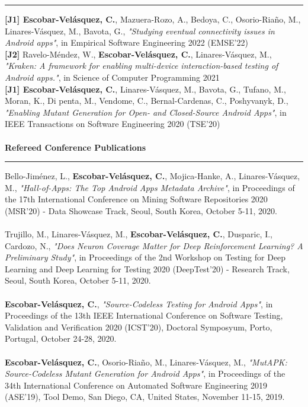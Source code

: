 \documentclass[letterpaper,11pt,oneside]{article}
\begin{document}
\vspace{-2ex}
\hrule 
\normalsize
\vspace{2ex}
\noindent \textbf{[J1] Escobar-Velásquez, C.}, Mazuera-Rozo, A., Bedoya, C., Osorio-Riaño, M., Linares-Vásquez, M., Bavota, G., \textit{"Studying eventual connectivity issues in Android apps"}, in Empirical Software Engineering 2022 (EMSE'22)\\
\noindent \textbf{[J2]} Ravelo-Méndez, W., \textbf{Escobar-Velásquez, C.},  Linares-Vásquez, M., \textit{"Kraken: A framework for enabling multi-device interaction-based testing of Android apps."}, in Science of Computer Programming 2021\\
\noindent \textbf{[J1] Escobar-Velásquez, C.}, Linares-V\'asquez, M., Bavota, G., Tufano, M., Moran, K., Di penta, M., Vendome, C., Bernal-Cardenas, C., Poshyvanyk, D., \textit{"Enabling Mutant Generation for Open- and Closed-Source Android Apps"}, in IEEE Transactions on Software Engineering 2020 (TSE’20)\\
\\
\noindent \Large{\textbf{Refereed Conference Publications}} \\
\vspace{-2ex}
\hrule 
\normalsize
\vspace{2ex}
\noindent [c6] Bello-Jiménez, L., \textbf{Escobar-Velásquez, C.}, Mojica-Hanke, A., Linares-V\'asquez,  M., \textit{"Hall-of-Apps: The Top Android Apps Metadata Archive"}, in Proceedings of the 17th International Conference on Mining Software Repositories 2020 (MSR’20) - Data Showcase Track, Seoul, South Korea, October 5-11, 2020. \\
\\
\noindent [c5] Trujillo, M., Linares-V\'asquez,  M., \textbf{Escobar-Velásquez, C.}, Dusparic, I., Cardozo, N., \textit{"Does Neuron Coverage Matter for Deep Reinforcement Learning? A Preliminary Study"}, in Proceedings of the 2nd Workshop on Testing for Deep Learning and Deep Learning for Testing 2020 (DeepTest’20) - Research Track, Seoul, South Korea, October 5-11, 2020. \\
\\
\noindent [c4] \textbf{Escobar-Velásquez, C.}, \textit{"Source-Codeless Testing for Android Apps"}, in Proceedings of the 13th IEEE International Conference on Software Testing, Validation and Verification 2020 (ICST’20), Doctoral Symposyum, Porto, Portugal, October 24-28, 2020. \\
\\
\noindent [c3] \textbf{Escobar-Velásquez, C.}, Osorio-Riaño, M., Linares-Vásquez, M., \textit{"MutAPK: Source-Codeless Mutant Generation for Android Apps"}, in Proceedings of the 34th International Conference on Automated Software Engineering 2019 (ASE’19), Tool Demo, San Diego, CA, United States, November 11-15, 2019. \\
\end{document}
